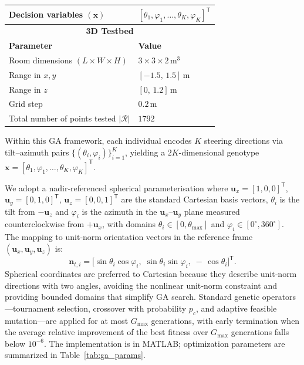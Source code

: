 \documentclass[journal]{IEEEtran}
\newcommand{\added}[1]{{\color{blue}#1}}
\begin{document}
\begin{table}[tbh]
\begin{tabular}{|l|l|}
Decision variables $(\mathbf x)$    & \([\theta_{1},\varphi_{1},\dots,\theta_{K},\varphi_{K}]^{\mathsf T}\) \\ \hline
\multicolumn{2}{|c|}{\textbf{3D Testbed}} \\ \hline
\textbf{Parameter}                  & \textbf{Value}                         \\ \hline
Room dimensions \((L\times W \times H)\) & \(3 \times 3 \times 2\,\mathrm{m^3}\)  \\ \hline
Range in \(x,y\)                    & \([-1.5,\,1.5]\,\mathrm{m}\)           \\ \hline
Range in \(z\)                      & \([0,\,1.2]\,\mathrm{m}\)              \\ \hline
Grid step                           & \(0.2\,\mathrm{m}\)                    \\ \hline
Total number of points tested \added{$|\mathcal{R}|$}  & \(1792\)                               \\ \hline
\end{tabular}
\end{table}

Within this GA framework, each individual encodes \(K\) steering directions via tilt–azimuth pairs \(\{(\theta_i,\varphi_i)\}_{i=1}^{K}\), yielding a \(2K\)-dimensional genotype \(\mathbf x = [\theta_1,\varphi_1,\dots,\theta_K,\varphi_K]^{\mathsf T}\).

We adopt a nadir‐referenced spherical parameterisation \added{where $\mathbf u_x=[1,0,0]^{\mathsf T}$, $\mathbf u_y=[0,1,0]^{\mathsf T}$, $\mathbf u_z=[0,0,1]^{\mathsf T}$ are the standard Cartesian basis vectors,} \(\theta_i\) is the tilt from \(-\mathbf u_z\) and \(\varphi_i\) is the azimuth in the \(\mathbf u_x\)–\( \mathbf u_y\) plane measured counterclockwise from \(+\mathbf u_x\), with domains \(\theta_i\in[0,\theta_{\max}]\) and \(\varphi_i\in[0^\circ,360^\circ]\). The mapping to unit‐norm orientation vectors in the reference frame \((\mathbf u_x,\mathbf u_y,\mathbf u_z)\) is:
\begin{equation}
\mathbf n_{t,i}
= \bigl[\sin\theta_i\cos\varphi_i,\;\sin\theta_i\sin\varphi_i,\;-\,\cos\theta_i\bigr]^{\mathsf T}.
\end{equation}
Spherical coordinates are preferred to Cartesian because they describe unit‐norm directions with two angles, avoiding the nonlinear unit‐norm constraint and providing bounded domains that simplify GA search.
Standard genetic operators—tournament selection, crossover with probability \(p_c\), and adaptive feasible mutation—are applied for at most \(G_{\max}\) generations, 
with early termination when the average relative improvement of the best fitness over \(G_{\max}\) generations falls below \(10^{-6}\).
The implementation is in MATLAB; optimization parameters are summarized in Table~\ref{tab:ga_params}.
\end{document}
